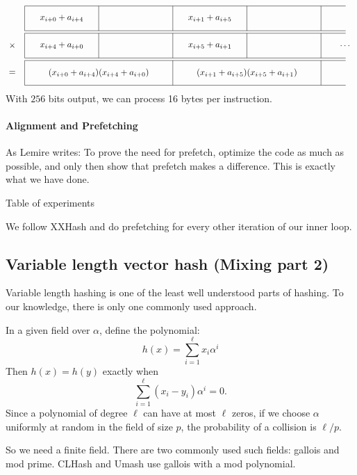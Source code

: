 \[
\begin{tikzpicture}
   \foreach \y in {0, -1.1, -2.2} {
      \draw (0, \y) -- (13, \y);
      \draw (0, \y-1) -- (13, \y-1);
   }
   \foreach \y in {0, -1.1}
      \foreach \x in {0,3,...,12}
         \draw (\x, \y) -- (\x, \y-1);
   \foreach \x in {0,6,...,12}
      \draw (\x, -2.2) -- (\x, -3.2);
   \node [draw=none] at (-.5, -1.6) {$\times$};
   \node [draw=none] at (-.5, -2.7) {$=$};
   \foreach \x [evaluate=\x as \z using {int(\x+4)}] in {0,1} {
      \node [draw=none] at (6*\x+1.5, -.5) {$x_{i+\x}+a_{i+\z}$};
      \node [draw=none] at (6*\x+1.5, -1.6) {$x_{i+\z}+a_{i+\x}$};
      \node [draw=none] at (6*\x+3, -2.7) {$(x_{i+\x}+a_{i+\z})(x_{i+\z}+a_{i+\x})$};
   }
   \node [draw=none] at (13, -1.6) {$\dots$};
\end{tikzpicture}
\]
With $256$ bits output, we can process 16 bytes per instruction.

\paragraph{Alignment and Prefetching}

As Lemire writes:
To prove the need for prefetch, optimize the code as much as possible, and only then show that prefetch makes a difference.
This is exactly what we have done.

Table of experiments

We follow XXHash and do prefetching for every other iteration of our inner loop.

\subsection{Variable length vector hash (Mixing part 2)}

Variable length hashing is one of the least well understood parts of hashing.
To our knowledge, there is only one commonly used approach.

In a given field over $\alpha$, define the polynomial:
\[h(x) = \sum_{i=1}^\ell x_i \alpha^i\]
Then $h(x)=h(y)$ exactly when
\[\sum_{i=1}^\ell (x_i-y_i) \alpha^i = 0.\]
Since a polynomial of degree $\ell$ can have at most $\ell$ zeros,
if we choose $\alpha$ uniformly at random in the field of size $p$,
the probability of a collision is $\ell/p$.

So we need a finite field.
There are two commonly used such fields: gallois and mod prime.
CLHash and Umash use gallois with a mod polynomial.

